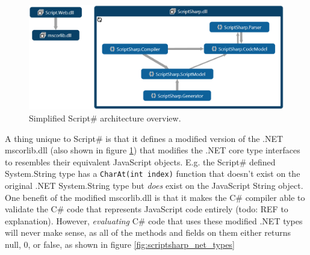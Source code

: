 
		\begin{figure}[H]
			\begin{center}
				\centerline{\includegraphics[width=16cm]{resources/images/SimplifiedOverview.png}}
			\end{center}
			\caption{Simplified Script\# architecture overview.}
			\label{simplifiedOverview}
		\end{figure}


		A thing unique to Script\# is that it defines a modified version of the .NET mscorlib.dll (also shown in figure \ref{simplifiedOverview}) that modifies the .NET core type interfaces to resembles their equivalent JavaScript objects. E.g. the Script\# defined System.String type has a \texttt{CharAt(int index)} function that doesn't exist on the original .NET System.String type but \emph{does} exist on the JavaScript String object. One benefit of the modified mscorlib.dll is that it makes the C\# compiler able to validate the C\# code that represents JavaScript code entirely (todo: REF to explanation). However, \emph{evaluating} C\# code that uses these modified .NET types will never make sense, as all of the methods and fields on them either returns null, 0, or false, as shown in figure \ref{fig:scriptsharp_net_types}


